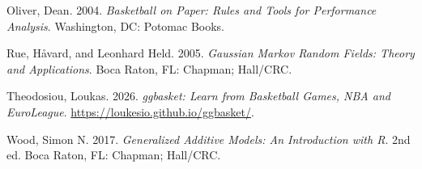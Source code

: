 \documentclass[
  11pt,
  a4paper,
]{article}
\newlength{\cslhangindent}
\newenvironment{CSLReferences}[2] %
 {\begin{list}{}{%
  \setlength{\itemindent}{0pt}
  \setlength{\leftmargin}{0pt}
  \setlength{\parsep}{0pt}
  \ifodd #1
   \setlength{\leftmargin}{\cslhangindent}
   \setlength{\itemindent}{-1\cslhangindent}
  \fi
  \setlength{\itemsep}{#2\baselineskip}}}
 {\end{list}}
\begin{document}
\begin{CSLReferences}{1}{0}
Oliver, Dean. 2004. \emph{Basketball on Paper: Rules and Tools for
Performance Analysis}. Washington, DC: Potomac Books.

Rue, Håvard, and Leonhard Held. 2005. \emph{Gaussian Markov Random
Fields: Theory and Applications}. Boca Raton, FL: Chapman; Hall/CRC.

Theodosiou, Loukas. 2026. \emph{{ggbasket}: Learn from Basketball Games,
{NBA} and {EuroLeague}}. \url{https://loukesio.github.io/ggbasket/}.

Wood, Simon N. 2017. \emph{Generalized Additive Models: An Introduction
with {R}}. 2nd ed. Boca Raton, FL: Chapman; Hall/CRC.

\end{CSLReferences}
\end{document}
